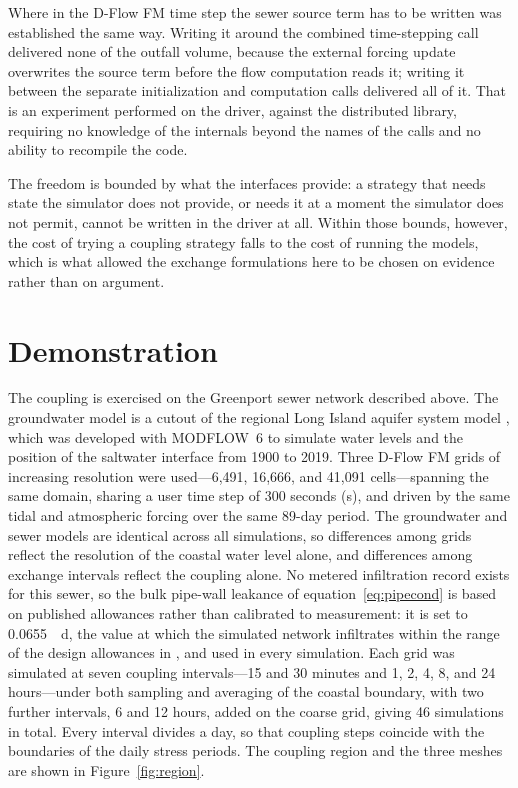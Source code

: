 \documentclass[preprint,authoryear,11pt]{elsarticle}
\begin{document}
Where in the D-Flow FM time step the sewer source term has to be written was established the same way. Writing it around the combined time-stepping call delivered none of the outfall volume, because the external forcing update overwrites the source term before the flow computation reads it; writing it between the separate initialization and computation calls delivered all of it. That is an experiment performed on the driver, against the distributed library, requiring no knowledge of the internals beyond the names of the calls and no ability to recompile the code.

The freedom is bounded by what the interfaces provide: a strategy that needs state the simulator does not provide, or needs it at a moment the simulator does not permit, cannot be written in the driver at all. Within those bounds, however, the cost of trying a coupling strategy falls to the cost of running the models, which is what allowed the exchange formulations here to be chosen on evidence rather than on argument.

\section{Demonstration}

The coupling is exercised on the Greenport sewer network described above. The groundwater model is a cutout of the regional Long Island aquifer system model \citep{walter2024longisland}, which was developed with MODFLOW~6 to simulate water levels and the position of the saltwater interface from 1900 to 2019. Three D-Flow FM grids of increasing resolution were used---6,491, 16,666, and 41,091 cells---spanning the same domain, sharing a user time step of 300 seconds (\si{\second}), and driven by the same tidal and atmospheric forcing over the same 89-day period. The groundwater and sewer models are identical across all simulations, so differences among grids reflect the resolution of the coastal water level alone, and differences among exchange intervals reflect the coupling alone. No metered infiltration record exists for this sewer, so the bulk pipe-wall leakance of equation~\ref{eq:pipecond} is based on published allowances rather than calibrated to measurement: it is set to \SI{0.0655}{\per\day}, the value at which the simulated network infiltrates within the range of the design allowances in \citet{asce2007gravity}, and used in every simulation. Each grid was simulated at seven coupling intervals---15 and 30 minutes and 1, 2, 4, 8, and 24 hours---under both sampling and averaging of the coastal boundary, with two further intervals, 6 and 12 hours, added on the coarse grid, giving 46 simulations in total. Every interval divides a day, so that coupling steps coincide with the boundaries of the daily stress periods. The coupling region and the three meshes are shown in Figure~\ref{fig:region}.
\end{document}
